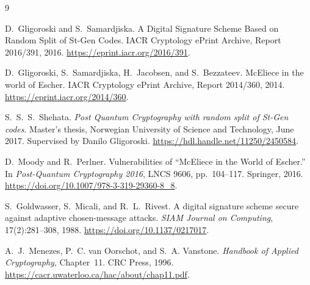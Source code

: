 \documentclass[10pt,a4paper]{article}
\begin{document}
\begin{thebibliography}{9}

D.~Gligoroski and S.~Samardjiska.
\newblock A Digital Signature Scheme Based on Random Split of St-Gen Codes.
\newblock IACR Cryptology ePrint Archive, Report 2016/391, 2016.
\newblock \url{https://eprint.iacr.org/2016/391}.

D.~Gligoroski, S.~Samardjiska, H.~Jacobsen, and S.~Bezzateev.
\newblock McEliece in the world of Escher.
\newblock IACR Cryptology ePrint Archive, Report 2014/360, 2014.
\newblock \url{https://eprint.iacr.org/2014/360}.

S.~S.~S.~Shehata.
\newblock \emph{Post Quantum Cryptography with random split of St-Gen codes}.
\newblock Master's thesis, Norwegian University of Science and Technology,
June 2017.  Supervised by Danilo Gligoroski.
\newblock \url{https://hdl.handle.net/11250/2450584}.

D.~Moody and R.~Perlner.
\newblock Vulnerabilities of ``McEliece in the World of Escher.''
\newblock In \emph{Post-Quantum Cryptography 2016}, LNCS 9606, pp.~104--117.
Springer, 2016.
\newblock \url{https://doi.org/10.1007/978-3-319-29360-8_8}.

S.~Goldwasser, S.~Micali, and R.~L.~Rivest.
\newblock A digital signature scheme secure against adaptive chosen-message
attacks.
\newblock \emph{SIAM Journal on Computing}, 17(2):281--308, 1988.
\newblock \url{https://doi.org/10.1137/0217017}.

A.~J.~Menezes, P.~C. van Oorschot, and S.~A. Vanstone.
\newblock \emph{Handbook of Applied Cryptography}, Chapter~11.
\newblock CRC Press, 1996.
\newblock \url{https://cacr.uwaterloo.ca/hac/about/chap11.pdf}.

\end{thebibliography}
\end{document}
